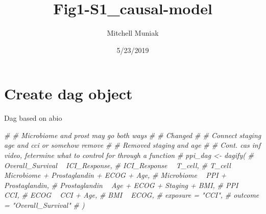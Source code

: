 \documentclass[
]{article}
\title{Fig1-S1\_causal-model}
\author{Mitchell Muniak}
\date{5/23/2019}
\newenvironment{Shaded}{\begin{snugshade}}{\end{snugshade}}
\newcommand{\CommentTok}[1]{\textcolor[rgb]{0.56,0.35,0.01}{\textit{#1}}}
\begin{document}
\maketitle

\hypertarget{create-dag-object}{%
\section{Create dag object}\label{create-dag-object}}

Dag based on abio

\begin{Shaded}
\begin{Highlighting}[]
\CommentTok{# # Microbiome and prost may go both ways}
\CommentTok{#    # Changed}
\CommentTok{# # Connect staging age and cci or somehow remove}
\CommentTok{#    # Removed staging and age}
\CommentTok{# # Cont. cas inf video, fetermine what to control for through a function}
\CommentTok{# ppi_dag <- dagify(}
\CommentTok{#    Overall_Survival ~ ICI_Response,}
\CommentTok{#    ICI_Response ~ T_cell,}
\CommentTok{#    T_cell ~ Microbiome + Prostaglandin + ECOG + Age,}
\CommentTok{#    Microbiome ~ PPI + Prostaglandin,}
\CommentTok{#    Prostaglandin ~ Age + ECOG + Staging + BMI,}
\CommentTok{#    PPI ~ CCI,}
\CommentTok{#    ECOG ~ CCI + Age,}
\CommentTok{#    BMI ~ ECOG,}
\CommentTok{#    exposure = "CCI",}
\CommentTok{#    outcome = "Overall_Survival"}
\CommentTok{# )}
\end{Highlighting}
\end{Shaded}
\end{document}

